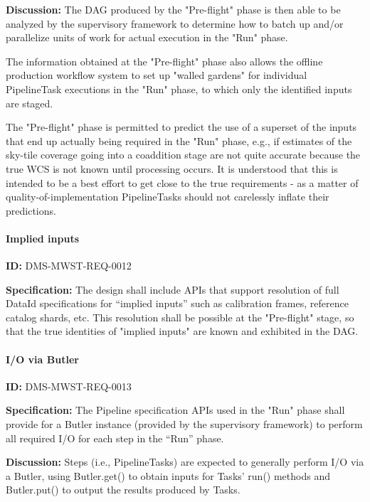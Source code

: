 \documentclass[SE,toc,lsstdraft]{lsstdoc}
\begin{document}
\textbf{Discussion:}
The DAG produced by the "Pre-flight" phase is then able to be analyzed by the supervisory framework to determine how to batch up and/or parallelize units of work for actual execution in the "Run" phase.

The information obtained at the "Pre-flight" phase also allows the offline production workflow system to set up "walled gardens" for individual PipelineTask executions in the "Run" phase, to which only the identified inputs are staged.

The "Pre-flight" phase is permitted to predict the use of a superset of the inputs that end up actually being required in the "Run" phase, e.g., if estimates of the sky-tile coverage going into a coaddition stage are not quite accurate because the true WCS is not known until processing occurs. It is understood that this is intended to be a best effort to get close to the true requirements - as a matter of quality-of-implementation PipelineTasks should not carelessly inflate their predictions.

\paragraph{Implied inputs}\hfill  %

\label{DMS-MWST-REQ-0012}
\textbf{ID:} DMS-MWST-REQ-0012

\textbf{Specification:}
The design shall include APIs that support resolution of full DataId specifications for “implied inputs” such as calibration frames, reference catalog shards, etc. This resolution shall be possible at the "Pre-flight" stage, so that the true identities of "implied inputs" are known and exhibited in the DAG.

\paragraph{I/O via Butler}\hfill  %

\label{DMS-MWST-REQ-0013}
\textbf{ID:} DMS-MWST-REQ-0013

\textbf{Specification:}
The Pipeline specification APIs used in the "Run" phase shall provide for a Butler instance (provided by the supervisory framework) to perform all required I/O for each step in the “Run” phase.

\textbf{Discussion:}
Steps (i.e., PipelineTasks) are expected to generally perform I/O via a Butler, using Butler.get() to obtain inputs for Tasks' run() methods and Butler.put() to output the results produced by Tasks.
\end{document}

